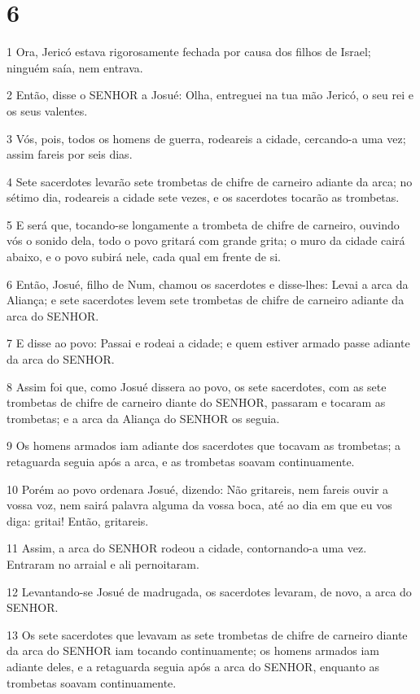 \chapter{6}

\par 1 Ora, Jericó estava rigorosamente fechada por causa dos filhos de Israel; ninguém saía, nem entrava.
\par 2 Então, disse o SENHOR a Josué: Olha, entreguei na tua mão Jericó, o seu rei e os seus valentes.
\par 3 Vós, pois, todos os homens de guerra, rodeareis a cidade, cercando-a uma vez; assim fareis por seis dias.
\par 4 Sete sacerdotes levarão sete trombetas de chifre de carneiro adiante da arca; no sétimo dia, rodeareis a cidade sete vezes, e os sacerdotes tocarão as trombetas.
\par 5 E será que, tocando-se longamente a trombeta de chifre de carneiro, ouvindo vós o sonido dela, todo o povo gritará com grande grita; o muro da cidade cairá abaixo, e o povo subirá nele, cada qual em frente de si.
\par 6 Então, Josué, filho de Num, chamou os sacerdotes e disse-lhes: Levai a arca da Aliança; e sete sacerdotes levem sete trombetas de chifre de carneiro adiante da arca do SENHOR.
\par 7 E disse ao povo: Passai e rodeai a cidade; e quem estiver armado passe adiante da arca do SENHOR.
\par 8 Assim foi que, como Josué dissera ao povo, os sete sacerdotes, com as sete trombetas de chifre de carneiro diante do SENHOR, passaram e tocaram as trombetas; e a arca da Aliança do SENHOR os seguia.
\par 9 Os homens armados iam adiante dos sacerdotes que tocavam as trombetas; a retaguarda seguia após a arca, e as trombetas soavam continuamente.
\par 10 Porém ao povo ordenara Josué, dizendo: Não gritareis, nem fareis ouvir a vossa voz, nem sairá palavra alguma da vossa boca, até ao dia em que eu vos diga: gritai! Então, gritareis.
\par 11 Assim, a arca do SENHOR rodeou a cidade, contornando-a uma vez. Entraram no arraial e ali pernoitaram.
\par 12 Levantando-se Josué de madrugada, os sacerdotes levaram, de novo, a arca do SENHOR.
\par 13 Os sete sacerdotes que levavam as sete trombetas de chifre de carneiro diante da arca do SENHOR iam tocando continuamente; os homens armados iam adiante deles, e a retaguarda seguia após a arca do SENHOR, enquanto as trombetas soavam continuamente.
